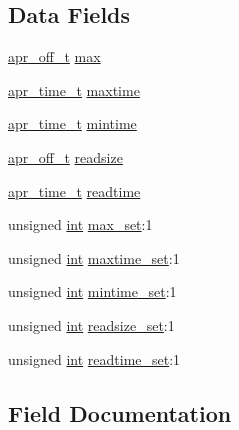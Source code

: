 \subsection*{Data Fields}
\begin{DoxyCompactItemize}
\item 
\hyperlink{group__apr__platform_ga6938af9075cec15c88299109381aa984}{apr\+\_\+off\+\_\+t} \hyperlink{structcache__socache__dir__conf_a5c9e06cfd65cb9abbbe7e64feba4d2c2}{max}
\item 
\hyperlink{group__apr__time_gadb4bde16055748190eae190c55aa02bb}{apr\+\_\+time\+\_\+t} \hyperlink{structcache__socache__dir__conf_abd57dccb7ce631522ab0bd9de6168a51}{maxtime}
\item 
\hyperlink{group__apr__time_gadb4bde16055748190eae190c55aa02bb}{apr\+\_\+time\+\_\+t} \hyperlink{structcache__socache__dir__conf_a6df427a6a0014b171705c1b63eafc695}{mintime}
\item 
\hyperlink{group__apr__platform_ga6938af9075cec15c88299109381aa984}{apr\+\_\+off\+\_\+t} \hyperlink{structcache__socache__dir__conf_a0a04052eaf1584ba7f9123f7cb603ace}{readsize}
\item 
\hyperlink{group__apr__time_gadb4bde16055748190eae190c55aa02bb}{apr\+\_\+time\+\_\+t} \hyperlink{structcache__socache__dir__conf_a0ea9c51e40b1846bec92a6aeb79b5a06}{readtime}
\item 
unsigned \hyperlink{pcre_8txt_a42dfa4ff673c82d8efe7144098fbc198}{int} \hyperlink{structcache__socache__dir__conf_ad58354dde7a88b03c0613851521c5993}{max\+\_\+set}\+:1
\item 
unsigned \hyperlink{pcre_8txt_a42dfa4ff673c82d8efe7144098fbc198}{int} \hyperlink{structcache__socache__dir__conf_a7b04bab54f9025bd7fd9a2656f7f2cda}{maxtime\+\_\+set}\+:1
\item 
unsigned \hyperlink{pcre_8txt_a42dfa4ff673c82d8efe7144098fbc198}{int} \hyperlink{structcache__socache__dir__conf_a9b6dd13c2a365e1c6b8418deee804d67}{mintime\+\_\+set}\+:1
\item 
unsigned \hyperlink{pcre_8txt_a42dfa4ff673c82d8efe7144098fbc198}{int} \hyperlink{structcache__socache__dir__conf_ae8ee2881db2c06fb9d3741800c80e9e0}{readsize\+\_\+set}\+:1
\item 
unsigned \hyperlink{pcre_8txt_a42dfa4ff673c82d8efe7144098fbc198}{int} \hyperlink{structcache__socache__dir__conf_ade44dc9d932fe0940686de053702a4c4}{readtime\+\_\+set}\+:1
\end{DoxyCompactItemize}


\subsection{Field Documentation}
